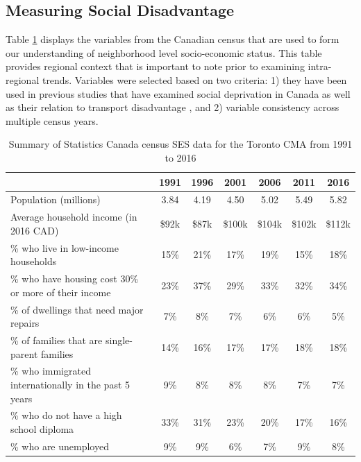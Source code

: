 \subsection{Measuring Social Disadvantage}

Table \ref{table:census} displays the variables from the Canadian census that are used to form our understanding of neighborhood level socio-economic status. This table provides regional context that is important to note prior to examining intra-regional trends. Variables were selected based on two criteria: 1) they have been used in previous studies that have examined social deprivation in Canada  as well as their relation to transport disadvantage , and 2) variable consistency across multiple census years.

\begin{table}[H]
	\small
	\centering
	\caption{{Summary of Statistics Canada census SES data for the Toronto CMA from 1991 to 2016}}
	\label{table:census}
	\begin{tabular}{lcccccc}
		\hline
		\textbf{}                          & \textbf{1991} & \textbf{1996} & \textbf{2001} & \textbf{2006} & \textbf{2011} & \textbf{2016} \\
		\hline
		Population (millions)                      & 3.84   & 4.19   & 4.50   & 5.02   & 5.49   & 5.82   \\
		Average household income (in 2016 CAD) & \$92k   & \$87k   & \$100k   & \$104k   & \$102k   & \$112k \\
		\% who live in low-income households                 & 15\% & 21\% & 17\% & 19\% & 15\% & 18\% \\
		\% who have housing cost 30\% or more of their income & 23\% & 37\% & 29\% & 33\% & 32\% & 34\% \\
		\% of dwellings that need major repairs            & 7\%  & 8\%  & 7\%  & 6\%  & 6\%  & 5\%  \\
		
		\% of families that are single-parent families               & 
		14\% & 16\% & 17\% & 17\% & 18\% & 18\% \\
		\% who immigrated internationally in the past 5 years              & 9\%  & 8\%  & 8\%  & 8\%  & 7\%  & 7\%  \\
		\% who do not have a high school diploma    & 33\% & 31\% & 23\% & 20\% & 17\% & 16\% \\
		\% who are unemployed                              & 9\%  & 9\%  & 6\%  & 7\%  & 9\%  & 8\%  \\
		\hline 
	\end{tabular}
\end{table}


